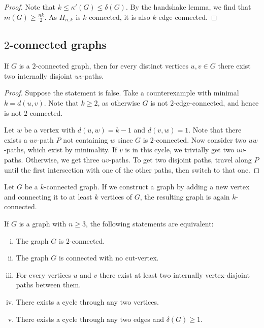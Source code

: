 \begin{proof}
Note that $k \leq \kappa'(G) \leq \delta(G)$. By the handshake
lemma, we find that $m(G) \geq \frac{nk}{2}$. As $H_{n,k}$ is
$k$-connected, it is also $k$-edge-connected.
\end{proof}

\newpage

\subsection{\texorpdfstring{$2$}{2}-connected graphs}

\begin{izrek}[Whitney]
If $G$ is a $2$-connected graph, then for every distinct vertices
$u, v \in G$ there exist two internally disjoint $uv$-paths.
\end{izrek}

\begin{proof}
Suppose the statement is false. Take a counterexample with minimal
$k = d(u,v)$. Note that $k \geq 2$, as otherwise $G$ is not
$2$-edge-connected, and hence is not $2$-connected.

Let $w$ be a vertex with $d(u,w) = k-1$ and $d(v,w) = 1$. Note that
there exists a $uv$-path $P$ not containing $w$ since $G$ is
$2$-connected. Now consider two $uw$-paths, which exist by
minimality. If $v$ is in this cycle, we trivially get two
$uv$-paths. Otherwise, we get three $uv$-paths. To get two disjoint
paths, travel along $P$ until the first intersection with one of
the other paths, then switch to that one.
\end{proof}

\begin{lema}[Expansion]
Let $G$ be a $k$-connected graph. If we construct a graph by adding
a new vertex and connecting it to at least $k$ vertices of $G$, the
resulting graph is again $k$-connected.
\end{lema}

\obvs


\begin{izrek}
If $G$ is a graph with $n \geq 3$, the following statements are
equivalent:

\begin{enumerate}[i)]
\item The graph $G$ is $2$-connected.
\item The graph $G$ is connected with no cut-vertex.
\item For every vertices $u$ and $v$ there exist at least two
internally vertex-disjoint paths between them.
\item There exists a cycle through any two vertices.
\item There exists a cycle through any two edges and
$\delta(G) \geq 1$.
\end{enumerate}
\end{izrek}

